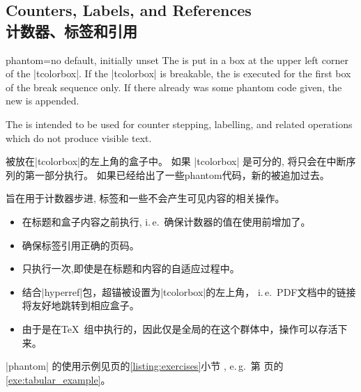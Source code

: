 \subsection{Counters, Labels, and References\\计数器、标签和引用}%
 
\begin{docTcbKey}{phantom}{=}{no default, initially unset}
The  is put in a box at the upper left corner of the |tcolorbox|.
If the |tcolorbox| is breakable, the  is executed for the first box of
the break sequence only. If there already was some phantom code given, the
new  is appended.\par
The  is intended to be used for counter stepping, labelling, and
related operations which do not produce visible text.

被放在|tcolorbox|的左上角的盒子中。%
如果 |tcolorbox| 是可分的,  将只会在中断序列的第一部分执行。%
如果已经给出了一些phantom代码，新的被追加过去。\par
{}旨在用于计数器步进, 标签和一些不会产生可见内容的相关操作。
\begin{itemize}
\item 
在标题和盒子内容之前执行, i.\,e.\ 确保计数器的值在使用前增加了。
\item %
确保标签引用正确的页码。
\item 
只执行一次,即使是在标题和内容的自适应过程中。
\item 
结合|hyperref|包，超锚被设置为|tcolorbox|的左上角， i.\,e.\ PDF文档中的链接将友好地跳转到相应盒子。

\item 
由于是在\TeX\ 组中执行的，因此仅是全局的在这个群体中，操作可以存活下来。
\end{itemize}
|phantom| 的使用示例见\pageref{listing:exercises}页的\ref{listing:exercises}小节
, e.\,g.\ 第 \pageref{exe:tabular_example} 页的 \ref{exe:tabular_example}。
\end{docTcbKey}


